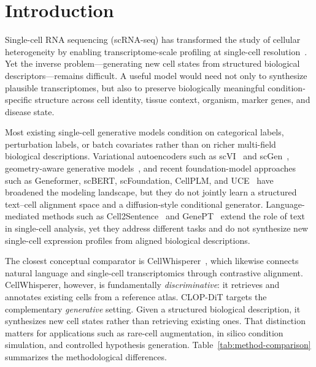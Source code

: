 \documentclass[genes,article,submit,pdftex,oneauthor]{Definitions/mdpi}
\begin{document}
\section{Introduction}

Single-cell RNA sequencing (scRNA-seq) has transformed the study of cellular heterogeneity by enabling transcriptome-scale profiling at single-cell resolution~\cite{ref-scrnaseq-review,ref-10x}. Yet the inverse problem---generating new cell states from structured biological descriptors---remains difficult. A useful model would need not only to synthesize plausible transcriptomes, but also to preserve biologically meaningful condition-specific structure across cell identity, tissue context, organism, marker genes, and disease state.

Most existing single-cell generative models condition on categorical labels, perturbation labels, or batch covariates rather than on richer multi-field biological descriptions. Variational autoencoders such as scVI~\cite{ref-scvi,ref-scvi-tools} and scGen~\cite{ref-scgen}, geometry-aware generative models~\cite{ref-scdiff}, and recent foundation-model approaches such as Geneformer, scBERT, scFoundation, CellPLM, and UCE~\cite{ref-geneformer,ref-scbert,ref-scfoundation,ref-cellplm,ref-uce} have broadened the modeling landscape, but they do not jointly learn a structured text--cell alignment space and a diffusion-style conditional generator. Language-mediated methods such as Cell2Sentence~\cite{ref-cell2sentence} and GenePT~\cite{ref-genept} extend the role of text in single-cell analysis, yet they address different tasks and do not synthesize new single-cell expression profiles from aligned biological descriptions.

The closest conceptual comparator is CellWhisperer~\cite{ref-cellwhisperer}, which likewise connects natural language and single-cell transcriptomics through contrastive alignment. CellWhisperer, however, is fundamentally \emph{discriminative}: it retrieves and annotates existing cells from a reference atlas. CLOP-DiT targets the complementary \emph{generative} setting. Given a structured biological description, it synthesizes new cell states rather than retrieving existing ones. That distinction matters for applications such as rare-cell augmentation, in silico condition simulation, and controlled hypothesis generation. Table~\ref{tab:method-comparison} summarizes the methodological differences.
\end{document}
